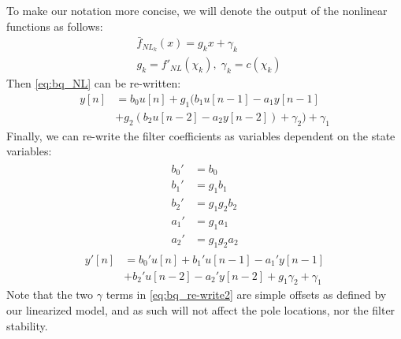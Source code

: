 \documentclass{IEEEtran}
\begin{document}
To make our notation more concise, we will denote the
output of the nonlinear functions as follows:
\begin{equation}
\begin{split}
    & \bar{f}_{NL_k}(x) = g_k x + \gamma_k \\
    & g_k = f'_{NL}(\chi_k), \; \gamma_k = c(\chi_k)
\end{split}
    \label{eq:linearized_bqnls}
\end{equation}
Then \cref{eq:bq_NL} can be re-written:
%
\begin{equation}
\begin{split}
    y[n] &= b_0 u[n]
         + g_1 (b_1 u[n-1] - a_1 y[n-1] \\
         &+ g_2 (b_2 u[n-2] - a_2 y[n-2]) + \gamma_2) + \gamma_1
\end{split}
    \label{eq:bq_re-write}
\end{equation}
%
Finally, we can re-write the filter coefficients as variables dependent on
the state variables:
%
\begin{align}
\begin{split}
    b_0' &= b_0\\
    b_1' &= g_1 b_1\\
    b_2' &= g_1g_2 b_2\\
    a_1' &= g_1 a_1\\
    a_2' &= g_1g_2 a_2
\end{split}
    \label{eq:bq_coefs_re-write}
\end{align}
%
\begin{equation}
\begin{split}
    y'[n] &= b_0' u[n]
    + b_1' u[n-1] - a_1' y[n-1] \\
    & + b_2' u[n-2] - a_2' y[n-2]
    + g_1\gamma_2 + \gamma_1
\end{split}
    \label{eq:bq_re-write2}
\end{equation}
%
Note that the two $\gamma$ terms in \cref{eq:bq_re-write2} are simple
offsets as defined by our linearized model, and as such will not
affect the pole locations, nor the filter stability.
\end{document}
